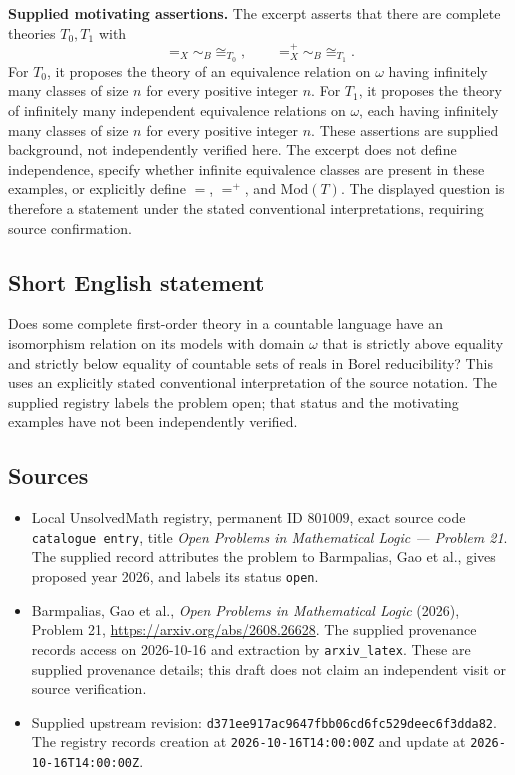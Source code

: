 \documentclass[11pt]{article}
\begin{document}
\textbf{Supplied motivating assertions.} The excerpt asserts that there are complete theories \(T_0,T_1\) with
\[
=_X\sim_B\cong_{T_0},\qquad
=_X^{+}\sim_B\cong_{T_1}.
\]
For \(T_0\), it proposes the theory of an equivalence relation on \(\omega\) having infinitely many classes of size \(n\) for every positive integer \(n\). For \(T_1\), it proposes the theory of infinitely many independent equivalence relations on \(\omega\), each having infinitely many classes of size \(n\) for every positive integer \(n\). These assertions are supplied background, not independently verified here. The excerpt does not define independence, specify whether infinite equivalence classes are present in these examples, or explicitly define \(=\), \(=^{+}\), and \(\mathrm{Mod}(T)\). The displayed question is therefore a statement under the stated conventional interpretations, requiring source confirmation.
\subsection{Short English statement}
Does some complete first-order theory in a countable language have an isomorphism relation on its models with domain \(\omega\) that is strictly above equality and strictly below equality of countable sets of reals in Borel reducibility? This uses an explicitly stated conventional interpretation of the source notation. The supplied registry labels the problem open; that status and the motivating examples have not been independently verified.
\subsection{Sources}
\begin{itemize}
\item Local UnsolvedMath registry, permanent ID \(801009\), exact source code \texttt{catalogue entry}, title \emph{Open Problems in Mathematical Logic --- Problem 21}. The supplied record attributes the problem to Barmpalias, Gao et al., gives proposed year 2026, and labels its status \texttt{open}.
\item Barmpalias, Gao et al., \emph{Open Problems in Mathematical Logic} (2026), Problem 21, \url{https://arxiv.org/abs/2608.26628}. The supplied provenance records access on 2026-10-16 and extraction by \texttt{arxiv\_latex}. These are supplied provenance details; this draft does not claim an independent visit or source verification.
\item Supplied upstream revision: \texttt{d371ee917ac9647fbb06cd6fc529deec6f3dda82}. The registry records creation at \texttt{2026-10-16T14:00:00Z} and update at \texttt{2026-10-16T14:00:00Z}.
\end{itemize}
\end{document}
